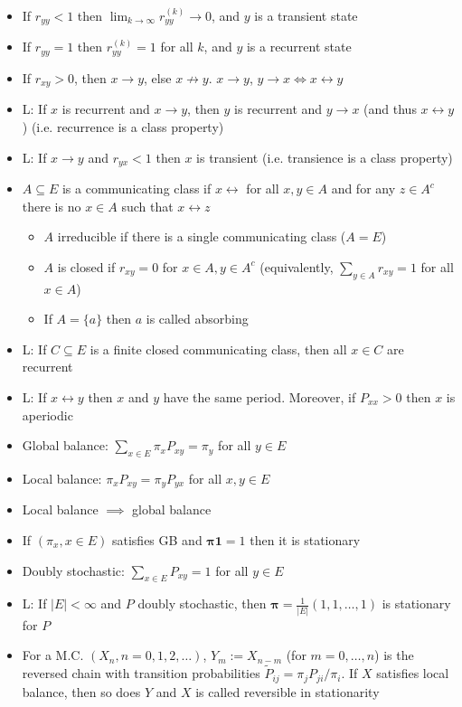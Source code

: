 \begin{itemize}
    \item If $r_{yy} < 1$ then $\lim_{k\to\infty} r_{yy}^{(k)} \to 0$, and $y$ is a transient state
    \item If $r_{yy} = 1$ then $r_{yy}^{(k)} = 1$ for all $k$, and $y$ is a recurrent state
    \item If $r_{xy} > 0$, then $x \to y$, else $x \not\to y$. $x \to y$, $y \to x \iff x \leftrightarrow y$
    \item L: If $x$ is recurrent and $x \to y$, then $y$ is recurrent and $y \to x$ (and thus $x \leftrightarrow y$) (i.e. recurrence is a class property)
    \item L: If $x \to y$ and $r_{yx} < 1$ then $x$ is transient (i.e. transience is a class property)
    \item $A \subseteq E$ is a communicating class if $x \leftrightarrow$ for all $x, y \in A$ and for any $z \in A^c$ there is no $x \in A$ such that $x \leftrightarrow z$
    \begin{itemize}
        \item $A$ irreducible if there is a single communicating class ($A = E$)
        \item $A$ is closed if $r_{xy} = 0$ for $x \in A, y \in A^c$ (equivalently, $\sum_{y\in A} r_{xy} = 1$ for all $x \in A$)
        \item If $A = \{a\}$ then $a$ is called absorbing
    \end{itemize}
    \item L: If $C \subseteq E$ is a finite closed communicating class, then all $x \in C$ are recurrent
    \item L: If $x \leftrightarrow y$ then $x$ and $y$ have the same period. Moreover, if $P_{xx} > 0$ then $x$ is aperiodic
    \item Global balance: $\sum_{x\in E}\pi_x P_{xy} = \pi_y$ for all $y \in E$
    \item Local balance: $\pi_x P_{xy} = \pi_y P_{yx}$ for all $x, y \in E$
    \item Local balance $\implies$ global balance
    \item If $(\pi_x, x \in E)$ satisfies GB and $\boldsymbol{\pi 1} = 1$ then it is stationary
    \item Doubly stochastic: $\sum_{x\in E} P_{xy} = 1$ for all $y \in E$
    \item L: If $|E| < \infty$ and $P$ doubly stochastic, then $\boldsymbol{\pi} = \frac{1}{|E|}(1, 1, \dots, 1)$ is stationary for $P$
    \item For a M.C. $(X_n, n = 0,1,2,\dots)$, $Y_m := X_{n-m}$ (for $m = 0, \dots, n$) is the reversed chain with transition probabilities $\tilde{P}_{ij} = \pi_j P_{ji} / \pi_i$. If $X$ satisfies local balance, then so does $Y$ and $X$ is called reversible in stationarity

\end{itemize}

